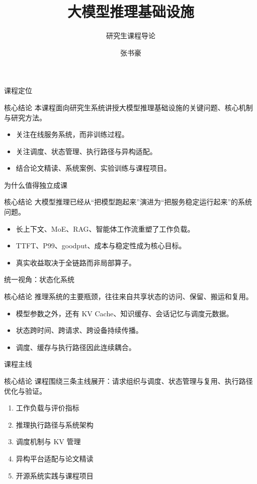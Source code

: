 \documentclass[11pt,aspectratio=169]{ctexbeamer}
\title{大模型推理基础设施}
\subtitle{研究生课程导论}
\author{张书豪}
\institute{华中科技大学计算机学院}
\date{}
\newcommand{\Core}[1]{
  \begin{block}{核心结论}
    #1
  \end{block}
}
\begin{document}
\begin{frame}[plain]
  \titlepage
\end{frame}

\begin{frame}{课程定位}
  \Core{本课程面向研究生系统讲授大模型推理基础设施的关键问题、核心机制与研究方法。}
  \begin{itemize}
    \item 关注在线服务系统，而非训练过程。
    \item 关注调度、状态管理、执行路径与异构适配。
    \item 结合论文精读、系统案例、实验训练与课程项目。
  \end{itemize}
\end{frame}

\begin{frame}{为什么值得独立成课}
  \Core{大模型推理已经从“把模型跑起来”演进为“把服务稳定运行起来”的系统问题。}
  \begin{itemize}
    \item 长上下文、MoE、RAG、智能体工作流重塑了工作负载。
    \item TTFT、P99、goodput、成本与稳定性成为核心目标。
    \item 真实收益取决于全链路而非局部算子。
  \end{itemize}
\end{frame}

\begin{frame}{统一视角：状态化系统}
  \Core{推理系统的主要瓶颈，往往来自共享状态的访问、保留、搬运和复用。}
  \begin{itemize}
    \item 模型参数之外，还有 KV Cache、知识缓存、会话记忆与调度元数据。
    \item 状态跨时间、跨请求、跨设备持续传播。
    \item 调度、缓存与执行路径因此连续耦合。
  \end{itemize}
\end{frame}

\begin{frame}{课程主线}
  \Core{课程围绕三条主线展开：请求组织与调度、状态管理与复用、执行路径优化与验证。}
  \begin{enumerate}
    \item 工作负载与评价指标
    \item 推理执行路径与系统架构
    \item 调度机制与 KV 管理
    \item 异构平台适配与论文精读
    \item 开源系统实践与课程项目
  \end{enumerate}
\end{frame}
\end{document}
